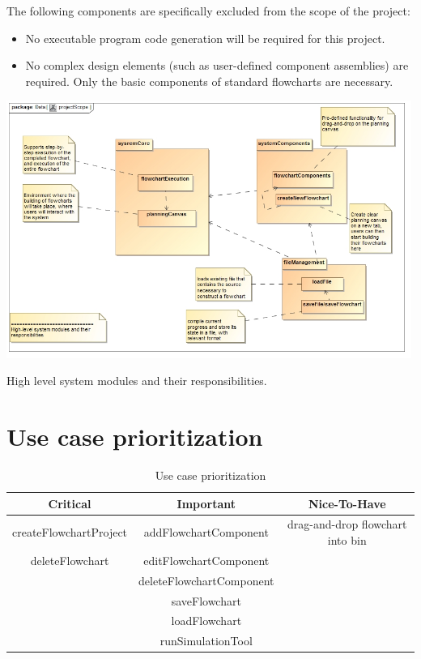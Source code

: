 \documentclass[11pt,a4paper,titlepage]{article}
\begin{document}
The following components are specifically excluded from the scope of the project:

\begin{itemize}
\item No executable program code generation will be required for this project.
\item No complex design elements (such as user-defined component assemblies) are required.
Only the basic components of standard flowcharts are necessary.\\

\end{itemize}

\includegraphics[width=500px]{projectScope.jpg}
\centerline{High level system modules and their responsibilities.}


\newpage	
\section{Use case prioritization}


\begin{table}[h!]  
    \caption{Use case prioritization}

    \label{tab:table1}
    \begin{tabular}{ccc}

      \toprule

      Critical & Important & Nice-To-Have\\

      \midrule	

      createFlowchartProject & addFlowchartComponent &  drag-and-drop flowchart into bin\\
      deleteFlowchart & editFlowchartComponent & \\
       & deleteFlowchartComponent & \\
       & saveFlowchart & \\
       & loadFlowchart & \\
       & runSimulationTool & \\
      \bottomrule

    \end{tabular}
  
\end{table}
\end{document}
